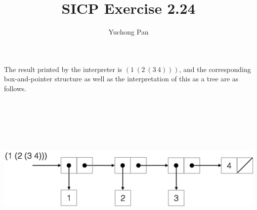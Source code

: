 \documentclass[11pt, oneside]{article}
\title{SICP Exercise 2.24}
\author{Yuchong Pan}
\begin{document}
\maketitle

The result printed by the interpreter is $(1~(2~(3~4)))$, and the corresponding box-and-pointer structure as well as the interpretation of this as a tree are as follows.

~

~

~

\begin{center}
    \includegraphics[height=3cm]{box-and-pointer.png}
    
    ~

    ~

    ~

\end{center}
\end{document}
